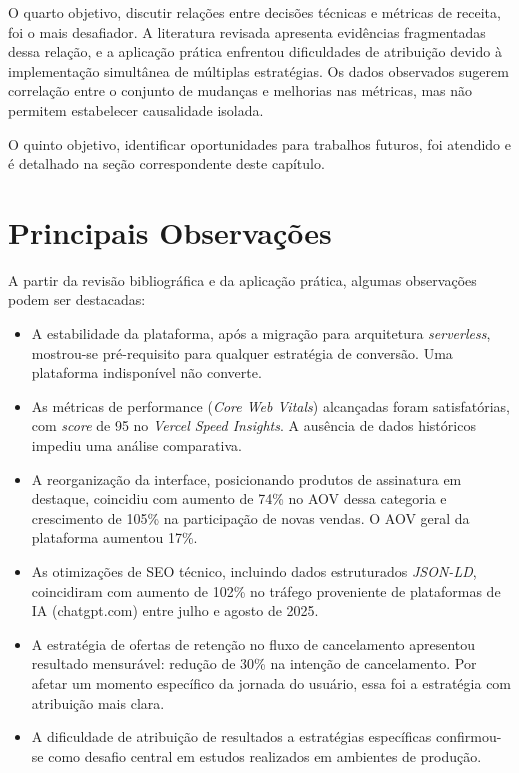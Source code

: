 O quarto objetivo, discutir relações entre decisões técnicas e métricas de receita, foi o mais desafiador. A literatura revisada apresenta evidências fragmentadas dessa relação, e a aplicação prática enfrentou dificuldades de atribuição devido à implementação simultânea de múltiplas estratégias. Os dados observados sugerem correlação entre o conjunto de mudanças e melhorias nas métricas, mas não permitem estabelecer causalidade isolada.

O quinto objetivo, identificar oportunidades para trabalhos futuros, foi atendido e é detalhado na seção correspondente deste capítulo.

\section{Principais Observações}

A partir da revisão bibliográfica e da aplicação prática, algumas observações podem ser destacadas:

\begin{itemize}
    \item A estabilidade da plataforma, após a migração para arquitetura \textit{serverless}, mostrou-se pré-requisito para qualquer estratégia de conversão. Uma plataforma indisponível não converte.

    \item As métricas de performance (\textit{Core Web Vitals}) alcançadas foram satisfatórias, com \textit{score} de 95 no \textit{Vercel Speed Insights}. A ausência de dados históricos impediu uma análise comparativa.

    \item A reorganização da interface, posicionando produtos de assinatura em destaque, coincidiu com aumento de 74\% no AOV dessa categoria e crescimento de 105\% na participação de novas vendas. O AOV geral da plataforma aumentou 17\%.

    \item As otimizações de SEO técnico, incluindo dados estruturados \textit{JSON-LD}, coincidiram com aumento de 102\% no tráfego proveniente de plataformas de IA (chatgpt.com) entre julho e agosto de 2025.

    \item A estratégia de ofertas de retenção no fluxo de cancelamento apresentou resultado mensurável: redução de 30\% na intenção de cancelamento. Por afetar um momento específico da jornada do usuário, essa foi a estratégia com atribuição mais clara.

    \item A dificuldade de atribuição de resultados a estratégias específicas confirmou-se como desafio central em estudos realizados em ambientes de produção.
\end{itemize}

